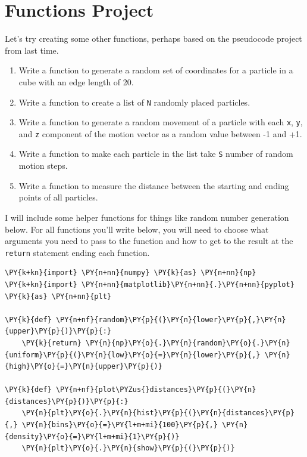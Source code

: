 \section{Functions Project}
Let's try creating some other functions, perhaps based on the pseudocode
project from last time.

\begin{enumerate}
\def\labelenumi{\arabic{enumi}.}
\tightlist
\item
  Write a function to generate a random set of coordinates for a
  particle in a cube with an edge length of 20.
\item
  Write a function to create a list of \texttt{N} randomly placed
  particles.
\item
  Write a function to generate a random movement of a particle with each
  \texttt{x}, \texttt{y}, and \texttt{z} component of the motion vector
  as a random value between -1 and +1.
\item
  Write a function to make each particle in the list take \texttt{S}
  number of random motion steps.
\item
  Write a function to measure the distance between the starting and
  ending points of all particles.
\end{enumerate}

I will include some helper functions for things like random number
generation below. For all functions you'll write below, you will need to
choose what arguments you need to pass to the function and how to get to
the result at the \texttt{return} statement ending each function.

    \begin{tcolorbox}[breakable, size=fbox, boxrule=1pt, pad at break*=1mm,colback=cellbackground, colframe=cellborder]
\begin{Verbatim}[commandchars=\\\{\}]
\PY{k+kn}{import} \PY{n+nn}{numpy} \PY{k}{as} \PY{n+nn}{np}
\PY{k+kn}{import} \PY{n+nn}{matplotlib}\PY{n+nn}{.}\PY{n+nn}{pyplot} \PY{k}{as} \PY{n+nn}{plt}

\PY{k}{def} \PY{n+nf}{random}\PY{p}{(}\PY{n}{lower}\PY{p}{,}\PY{n}{upper}\PY{p}{)}\PY{p}{:}
    \PY{k}{return} \PY{n}{np}\PY{o}{.}\PY{n}{random}\PY{o}{.}\PY{n}{uniform}\PY{p}{(}\PY{n}{low}\PY{o}{=}\PY{n}{lower}\PY{p}{,} \PY{n}{high}\PY{o}{=}\PY{n}{upper}\PY{p}{)}

\PY{k}{def} \PY{n+nf}{plot\PYZus{}distances}\PY{p}{(}\PY{n}{distances}\PY{p}{)}\PY{p}{:}
    \PY{n}{plt}\PY{o}{.}\PY{n}{hist}\PY{p}{(}\PY{n}{distances}\PY{p}{,} \PY{n}{bins}\PY{o}{=}\PY{l+m+mi}{100}\PY{p}{,} \PY{n}{density}\PY{o}{=}\PY{l+m+mi}{1}\PY{p}{)}
    \PY{n}{plt}\PY{o}{.}\PY{n}{show}\PY{p}{(}\PY{p}{)}
\end{Verbatim}
\end{tcolorbox}

